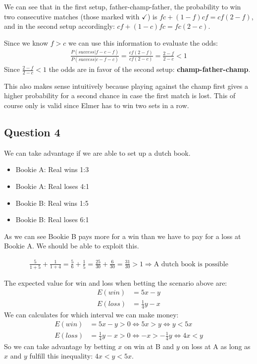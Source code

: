 \documentclass[../main/Notes.tex]{subfiles}
\begin{document}
We can see that in the first setup, father-champ-father, the probability to win two consecutive matches (those marked with $\checkmark$) is $fc+(1-f)cf=cf(2-f)$, and in the second setup accordingly: $cf+(1-c)fc=fc(2-c)$.

Since we know $f>c$ we can use this information to evaluate the odds:
\begin{align*}
\frac{P(success|f-c-f)}{P(success|c-f-c)} = \frac{cf(2-f)}{cf(2-c)} = \frac{2-f}{2-c} < 1
\end{align*}
Since $\frac{2-f}{2-c} < 1$ the odds are in favor of the second setup: \textbf{champ-father-champ}.

This also makes sense intuitively because playing against the champ first gives a higher probability for a second chance in case the first match is lost. This of course only is valid since Elmer has to win two sets in a row.



\subsection*{Question 4}
We can take advantage if we are able to set up a dutch book.
\begin{itemize}
	\item Bookie A: Real wins 1:3
  \item Bookie A: Real loses 4:1
	\item Bookie B: Real wins 1:5
  \item Bookie B: Real loses 6:1
\end{itemize}

As we can see Bookie B pays more for a win than we have to pay for a loss at Bookie A. We should be able to exploit this.

\begin{align*}
\frac{5}{1+5}+\frac{1}{1+4} = \frac{5}{6} + \frac{1}{5} = \frac{25}{30} + \frac{6}{30} = \frac{31}{30} > 1 \Rightarrow \text{A dutch book is possible}
\end{align*}

The expected value for win and loss when betting the scenario above are:
\begin{align*}
E(win)  &= 5x-y \\
E(loss) &= \frac{1}{4}y-x
\end{align*}
We can calculates for which interval we can make money:
\begin{align*}
E(win)  &= 5x-y           > 0 \Leftrightarrow 5x>y             \Leftrightarrow y < 5x \\
E(loss) &= \frac{1}{4}y-x > 0 \Leftrightarrow -x>-\frac{1}{4}y \Leftrightarrow 4x < y
\end{align*}
So we can take advantage by betting $x$ on win at B and $y$ on loss at A as long as $x$ and $y$ fulfill this inequality: $4x<y<5x$.
\end{document}
